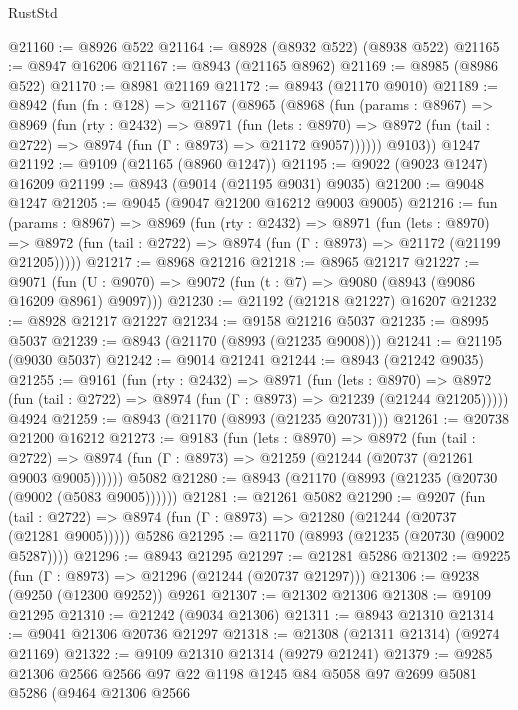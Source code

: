 \begin{lexlean}{RustStd}
\begin{coremodule}
{\begin{coremodule}
{{{{{{{{{{{{{{{{{{{{{{{{{{{{{{{{{{{{{{{@21160 := @8926 @522
@21164 := @8928 (@8932 @522) (@8938 @522)
@21165 := @8947 @16206
@21167 := @8943 (@21165 @8962)
@21169 := @8985 (@8986 @522)
@21170 := @8981 @21169
@21172 := @8943 (@21170 @9010)
@21189 := @8942
    (fun (fn : @128) =>
    @21167
      (@8965
        (@8968
          (fun (params : @8967) =>
          @8969
            (fun (rty : @2432) =>
            @8971
              (fun (lets : @8970) =>
              @8972 (fun (tail : @2722) => @8974 (fun (Γ : @8973) => @21172 @9057))))))
        @9103))
    @1247
@21192 := @9109 (@21165 (@8960 @1247))
@21195 := @9022 (@9023 @1247) @16209
@21199 := @8943 (@9014 (@21195 @9031) @9035)
@21200 := @9048 @1247
@21205 := @9045 (@9047 @21200 @16212 @9003 @9005)
@21216 := fun (params : @8967) =>
  @8969
    (fun (rty : @2432) =>
    @8971
      (fun (lets : @8970) =>
      @8972 (fun (tail : @2722) => @8974 (fun (Γ : @8973) => @21172 (@21199 @21205)))))
@21217 := @8968 @21216
@21218 := @8965 @21217
@21227 := @9071
    (fun (U : @9070) => @9072 (fun (t : @7) => @9080 (@8943 (@9086 @16209 @8961) @9097)))
@21230 := @21192 (@21218 @21227) @16207
@21232 := @8928 @21217 @21227
@21234 := @9158 @21216 @5037
@21235 := @8995 @5037
@21239 := @8943 (@21170 (@8993 (@21235 @9008)))
@21241 := @21195 (@9030 @5037)
@21242 := @9014 @21241
@21244 := @8943 (@21242 @9035)
@21255 := @9161
    (fun (rty : @2432) =>
    @8971
      (fun (lets : @8970) =>
      @8972 (fun (tail : @2722) => @8974 (fun (Γ : @8973) => @21239 (@21244 @21205)))))
    @4924
@21259 := @8943 (@21170 (@8993 (@21235 @20731)))
@21261 := @20738 @21200 @16212
@21273 := @9183
    (fun (lets : @8970) =>
    @8972
      (fun (tail : @2722) =>
      @8974 (fun (Γ : @8973) => @21259 (@21244 (@20737 (@21261 @9003 @9005))))))
    @5082
@21280 := @8943 (@21170 (@8993 (@21235 (@20730 (@9002 (@5083 @9005))))))
@21281 := @21261 @5082
@21290 := @9207
    (fun (tail : @2722) => @8974 (fun (Γ : @8973) => @21280 (@21244 (@20737 (@21281 @9005)))))
    @5286
@21295 := @21170 (@8993 (@21235 (@20730 (@9002 @5287))))
@21296 := @8943 @21295
@21297 := @21281 @5286
@21302 := @9225 (fun (Γ : @8973) => @21296 (@21244 (@20737 @21297)))
@21306 := @9238 (@9250 (@12300 @9252)) @9261
@21307 := @21302 @21306
@21308 := @9109 @21295
@21310 := @21242 (@9034 @21306)
@21311 := @8943 @21310
@21314 := @9041 @21306 @20736 @21297
@21318 := @21308 (@21311 @21314) (@9274 @21169)
@21322 := @9109 @21310 @21314 (@9279 @21241)
@21379 := @9285
    @21306
    @2566
    @2566
    @97
    @22
    @1198
    @1245
    @84
    @5058
    @97
    @2699
    @5081
    @5286
    (@9464
      @21306
      @2566
}}}}}}}}}}}}}}}}}}}}}}}}}}}}}}}}}}}}}}}
\end{coremodule}}
\end{coremodule}
\end{lexlean}
